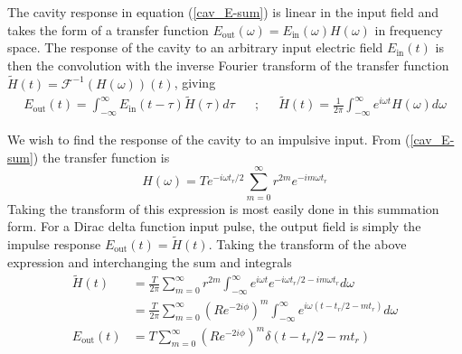 The cavity response in equation (\ref{cav_E-sum}) is linear in the input field and takes the form of a transfer function $E_\mathrm{out}(\omega) = E_\mathrm{in}(\omega) H(\omega)$ in frequency space. The response of the cavity to an arbitrary input electric field $E_\mathrm{in}(t)$ is then the convolution with the inverse Fourier transform of the transfer function $\tilde{H}(t) = \mathcal{F}^{-1}(H(\omega))(t)$, giving
\begin{align} \label{cav_convolution}
	E_\mathrm{out}(t) = \int_{-\infty}^{\infty} E_\mathrm{in}(t-\tau) \tilde{H}(\tau) d\tau &&;&&
	\tilde{H}(t) = \frac{1}{2\pi}\int_{-\infty}^{\infty} e^{i\omega t}H(\omega) d\omega
\end{align}

We wish to find the response of the cavity to an impulsive input. From (\ref{cav_E-sum}) the transfer function is
\begin{equation}
	H(\omega) = T e^{-i\omega t_r/2} \sum_{m=0}^\infty r^{2m} e^{-im\omega t_r}
\end{equation}
Taking the transform of this expression is most easily done in this summation form. For a Dirac delta function input pulse, the output field is simply the impulse response $E_\mathrm{out}(t) = \tilde{H}(t)$. Taking the transform of the above expression and interchanging the sum and integrals
\begin{align} \label{cav_impulse_response}
	\tilde{H}(t)
	&= \frac{T}{2\pi} \sum_{m=0}^\infty r^{2m} \int_{-\infty}^{\infty} e^{i\omega t} e^{-i\omega t_r/2 -im\omega t_r} d\omega \\
	&= \frac{T}{2\pi} \sum_{m=0}^\infty \left(Re^{-2i\phi}\right)^{m}\int_{-\infty}^{\infty} e^{i\omega (t - t_r/2 - m t_r)} d\omega \\
	E_\mathrm{out}(t) &= T \sum_{m=0}^\infty \left(Re^{-2i\phi}\right)^{m} \delta(t - t_r/2 - m t_r)
\end{align}

